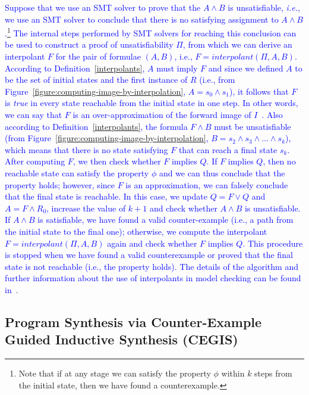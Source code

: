 \documentclass{cta-author}
\begin{document}
\textcolor{blue}{Suppose that we use an SMT solver to prove that the $A \wedge B$ is unsatisfiable, {\it i.e.}, we use an SMT solver to conclude that there is no satisfying assignment to $A \wedge B$.\footnote{Note that if at any stage we can satisfy the property $\phi$ within $k$ steps from the initial state, then we have found a counterexample.} The internal steps performed by SMT solvers for reaching this conclusion can be used to construct a proof of unsatisfiability $\Pi$, from which we can derive an interpolant $F$ for the pair of formulae $\left(A,B\right)$, i.e., $F = interpolant\left(\Pi, A, B\right)$. According to Definition~\ref{interpolants}, $A$ must imply $F$ and since we defined $A$ to be the set of initial states and the first instance of $R$ (i.e., from Figure~\ref{figure:computing-image-by-interpolation}, $A=s_{0} \wedge s_{1}$), it follows that $F$ is \textit{true} in every state reachable from the initial state in one step. In other words, we can say that $F$ is an over-approximation of the forward image of $I$~\cite{McMillan03,McMillan05}. Also according to Definition~\ref{interpolants}, the formula $F \wedge B$ must be unsatisfiable (from Figure~\ref{figure:computing-image-by-interpolation}, $B=s_{2} \wedge s_{3} \wedge \ldots \wedge s_{k}$), which means that there is no state satisfying $F$ that can reach a final state $s_k$. After computing $F$, we then check whether $F$ implies $Q$. If $F$ implies $Q$, then no reachable state can satisfy the property $\phi$ and we can thus conclude that the property holds; however, since $F$ is an approximation, we can falsely conclude that the final state is reachable. In this case, we update $Q = F \vee Q$ and $A = F \wedge R_{0}$, increase the value of $k+1$ and check whether $A \wedge B$ is unsatisfiable. If $A \wedge B$ is satisfiable, we have found a valid counter-example (i.e., a path from the initial state to the final one); otherwise, we compute the interpolant $F = interpolant\left(\Pi, A, B\right)$ again and check whether $F$ implies $Q$. This procedure is stopped when we have found a valid counterexample or proved that the final state is not reachable (i.e., the property holds). The details of the algorithm and further information about the use of interpolants in model checking can be found in~\cite{McMillan03,McMillan05}}. 

\subsection{Program Synthesis via Counter-Example \\ Guided Inductive Synthesis (CEGIS)}
\end{document}
